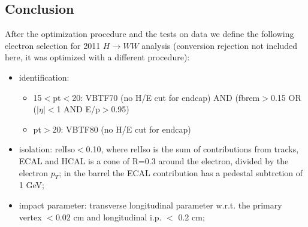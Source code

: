\subsection{Conclusion}
After the optimization procedure and the tests on data we define the following electron selection for 2011 $H\rightarrow WW$ analysis (conversion rejection not included here, it was optimized with a different procedure):
\begin{itemize}
\item identification: 
  \begin{itemize}
  \item 15$<$pt$<$20: VBTF70 (no H/E cut for endcap) AND (fbrem$>$0.15 OR ($|\eta|<$1 AND E/p$>$0.95)
  \item pt$>$20: VBTF80 (no H/E cut for endcap)
  \end{itemize}
\item isolation: relIso$<$0.10, where relIso is the sum of contributions from tracks, ECAL and HCAL is a cone of R=0.3 around the electron, 
  divided by the electron $p_T$; in the barrel the ECAL contribution has a pedestal subtrction of 1 GeV;
\item impact parameter: transverse longitudinal parameter w.r.t. the primary vertex $<0.02$ cm and longitudinal i.p. $<$ 0.2 cm;
\end{itemize}
